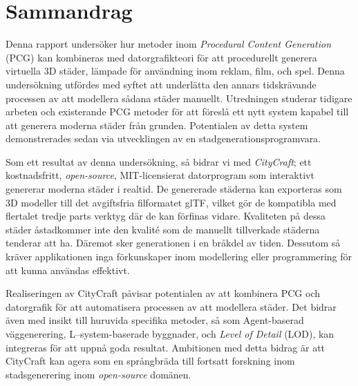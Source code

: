 \chapter*{Sammandrag}

Denna rapport undersöker hur metoder inom \textit{Procedural Content Generation} (PCG) kan kombineras med datorgrafikteori för att procedurellt generera virtuella 3D städer, lämpade för användning inom reklam, film, och spel.
Denna undersökning utfördes med syftet att underlätta den annars tidskrävande processen av att modellera sådana städer manuellt.
Utredningen studerar tidigare arbeten och existerande PCG metoder för att föreslå ett nytt system kapabel till att generera moderna städer från grunden.
Potentialen av detta system demonstrerades sedan via utvecklingen av en stadgenerationsprogramvara.

Som ett resultat av denna undersökning, så bidrar vi med \textit{CityCraft}; ett kostnadsfritt, \textit{open-source}, MIT-licensierat datorprogram som interaktivt genererar moderna städer i realtid.
De genererade städerna kan exporteras som 3D modeller till det avgiftsfria filformatet glTF, vilket gör de kompatibla med flertalet tredje parts verktyg där de kan förfinas vidare.
Kvaliteten på dessa städer åstadkommer inte den kvalité som de manuellt tillverkade städerna tenderar att ha.
Däremot sker generationen i en bråkdel av tiden.
Dessutom så kräver applikationen inga förkunskaper inom modellering eller programmering för att kunna användas effektivt.

Realiseringen av CityCraft påvisar potentialen av att kombinera PCG och datorgrafik för att automatisera processen av att modellera städer.
Det bidrar även med insikt till huruvida specifika metoder, så som Agent-baserad väggenerering, L--system-baserade byggnader, och \textit{Level of Detail} (LOD), kan integreras för att uppnå goda resultat.
Ambitionen med detta bidrag är att CityCraft kan agera som en språngbräda till fortsatt forskning inom stadsgenerering inom \textit{open-source} domänen.